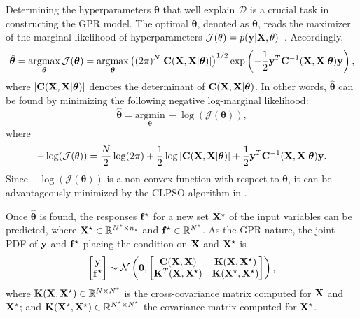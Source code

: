\documentclass[preprint,3p]{elsarticle}
\begin{document}
\begin{linenumbers}
Determining the hyperparameters $\boldsymbol{\theta}$ that well explain $\mathcal{D}$ is a crucial task in constructing the GPR model.
The optimal $\boldsymbol{\theta}$, denoted as $\hat{\boldsymbol{\theta}}$, reads the maximizer of the marginal likelihood of hyperparameters $\mathcal{J}(\theta)=p({\bf y}|{\bf X},\theta)$~\cite{Schulz2018,Rasmussen2006}. Accordingly,
\begin{equation}
		\hat{\boldsymbol{\theta}}=\underset{\boldsymbol{\theta}}{\mathrm{argmax}}\,\mathcal{J}(\boldsymbol{\theta})=\underset{\boldsymbol{\theta}}{\mathrm{argmax}} \left((2 \pi)^N |{\bf C}({\bf X},{\bf X}|\boldsymbol{\theta})|\right)^{1/2}\exp\left(-\frac{1}{2} {\bf y}^T {\bf C}^{-1}({\bf X},{\bf X}|\boldsymbol{\theta}) {\bf y} \right),
	\label{EQ:A6}
\end{equation}
where $|{\bf C}({\bf X},{\bf X}|\boldsymbol{\theta})|$ denotes the determinant of ${\bf C}({\bf X},{\bf X}|\boldsymbol{\theta})$. In other words, $\hat{\boldsymbol{\theta}}$ can be found by minimizing the following negative log-marginal likelihood:
\begin{equation}
	\hat{\boldsymbol{\theta}}=\underset{\boldsymbol{\theta}}{\mathrm{argmin}}\,-\log(\mathcal{J}(\boldsymbol{\theta})),
	\label{EQ:A7}
\end{equation}
where
\begin{equation}
	-\log(\mathcal{J}(\theta)) = \frac{N}{2}\log(2\pi)+\frac{1}{2}\log|{\bf C}({\bf X},{\bf X}|\boldsymbol{\theta})|
	+\frac{1}{2}{\bf y}^T{\bf C}^{-1}({\bf X},{\bf X}|\boldsymbol{\theta}){\bf y}.
	\label{EQ:A8}
\end{equation}
Since $-\log(\mathcal{J}(\boldsymbol{\theta}))$ is a non-convex function with respect to $\boldsymbol{\theta}$, it can be advantageously minimized by the CLPSO algorithm in .

Once $\hat{\boldsymbol{\theta}}$ is found, the responses ${ \bf f}^\star$ for a new set ${\bf X}^\star$ of the input variables can be predicted, where ${\bf X}^\star\in\mathbb{R}^{N^\star\times n_\text{x}}$ and ${\bf f}^\star\in\mathbb{R}^{N^\star}$. As the GPR nature, the joint PDF of ${\bf y}$ and ${\bf f}^\star$ placing the condition on ${\bf X}$ and ${\bf X}^\star$ is 
\begin{equation}
	\begin{bmatrix} {\bf y}\\{\bf f}^\star \end{bmatrix}\sim\mathcal{N}\left({\bf 0},\begin{bmatrix}
		{\bf C}({\bf X},{\bf X}) & {\bf K}({\bf X},{\bf X}^\star)\\
		{\bf K}^T({\bf X},{\bf X}^\star) & {\bf K}({\bf X}^\star,{\bf X}^\star)\\
	\end{bmatrix}\right),
    \label{EQ:A9}
\end{equation}
where
${\bf K}({\bf X},{\bf X}^\star)\in\mathbb{R}^{N\times N^\star}$ is the cross-covariance matrix computed for ${\bf X}$ and ${\bf X}^\star$; and ${\bf K}({\bf X}^\star,{\bf X}^\star) \in\mathbb{R}^{N^\star\times N^\star}$ the covariance matrix computed for ${\bf X}^\star$.


\end{linenumbers}
\end{document}
